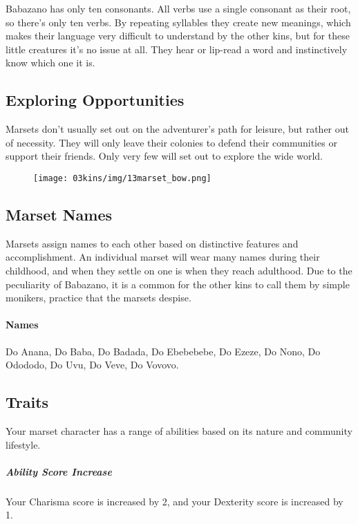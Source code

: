 Babazano has only ten consonants.
All verbs use a single consonant as their root, so there's only ten verbs.
By repeating syllables they create new meanings, which makes their language very difficult to understand by the other kins, but for these little creatures it's no issue at all.
They hear or lip-read a word and instinctively know which one it is.

\subsection*{Exploring Opportunities}
Marsets don't usually set out on the adventurer's path for leisure, but rather out of necessity.
They will only leave their colonies to defend their communities or support their friends.
Only very few will set out to explore the wide world.

\begin{figure}[!t]
    \centering
    \texttt{[image: 03kins/img/13marset\_bow.png]}
\end{figure}

\subsection*{Marset Names}
Marsets assign names to each other based on distinctive features and accomplishment.
An individual marset will wear many names during their childhood, and when they settle on one is when they reach adulthood.
Due to the peculiarity of Babazano, it is a common for the other kins to call them by simple monikers, practice that the marsets despise.

\paragraph{Names} Do Anana, Do Baba, Do Badada, Do Ebebebebe, Do Ezeze, Do Nono, Do Odododo, Do Uvu, Do Veve, Do Vovovo.

\subsection*{Traits}
Your marset character has a range of abilities based on its nature and community lifestyle.

\subparagraph{Ability Score Increase} Your Charisma score is increased by 2, and your Dexterity score is increased by 1.

